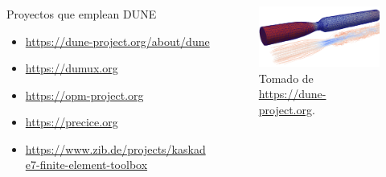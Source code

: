 \begin{frame}
	\frametitle{\secname}
	\framesubtitle{\subsecname}

	\begin{columns}
		\begin{column}{0.5\textwidth}
			\begin{alertblock}{Proyectos que emplean DUNE}
				\begin{itemize}
					\item \url{https://dune-project.org/about/dune}
					\item \url{https://dumux.org}
					\item \url{https://opm-project.org}
					\item \url{https://precice.org}
					\item \url{https://www.zib.de/projects/kaskade7-finite-element-toolbox}
				\end{itemize}
			\end{alertblock}
		\end{column}

		\begin{column}{0.5\textwidth}
			\begin{figure}[ht!]
				\centering
				\includegraphics[width=7.5cm]{blood_girke}
				\caption{Tomado de \url{https://dune-project.org}.}
			\end{figure}
		\end{column}
	\end{columns}
\end{frame}